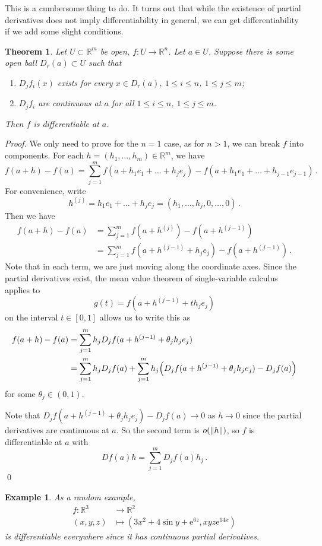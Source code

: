 \documentclass{article}
\theoremstyle{plain}\theoremheaderfont{\normalfont\itshape}\theorembodyfont{\rmfamily}\theoremseparator{.}\newtheorem*{rem}{Remark}\newtheorem*{ex}{Example}\newtheorem*{proof}{Proof}\newtheorem*{altp}{Alternative proof}
\theoremstyle{plain}\theoremheaderfont{\normalfont\bfseries}\theorembodyfont{\rmfamily}\theoremseparator{.}\newtheorem{thm}{Theorem}[section]\newtheorem{lem}[thm]{Lemma}\newtheorem{prop}[thm]{Proposition}\newtheorem*{cor}{Corollary}\newtheorem{defn}[thm]{Definition}\newtheorem{clm}[thm]{Claim}\newtheorem{clminproof}{Claim}
\theoremstyle{break}\theoremheaderfont{\normalfont\itshape}\theorembodyfont{\rmfamily}\theoremseparator{.\medskip}\newtheorem*{proofskip}{Proof}\newtheorem*{exs}{Examples}\newtheorem*{rems}{Remarks}
\theoremstyle{break}\theoremheaderfont{\normalfont\bfseries}\theorembodyfont{\rmfamily}\theoremseparator{.\medskip}\newtheorem{lemskip}[thm]{Lemma}\newtheorem{defnskip}[thm]{Definition}\newtheorem{propskip}[thm]{Proposition}\newtheorem{thmskip}[thm]{Theorem}
\newcommand{\qed}{\hfill\ensuremath{\Box}}
\newcommand{\ee}{\mathrm{e}}
\begin{document}
    This is a cumbersome thing to do. It turns out that while the existence of partial derivatives does not imply differentiability in general, we can get differentiability if we add some slight conditions.
    \begin{thm}
        Let \(U\subset\mathbb{R}^m\) be open, \(f:U\to\mathbb{R}^n\). Let \(a\in U\). Suppose there is some open ball \(D_r(a)\subset U\) such that
        \begin{enumerate}[label=(\roman*),topsep=0pt]
            \item \(D_jf_i(x)\) exists for every \(x\in D_r(a)\), \(1\le i\le n\), \(1\le j\le m\);
            \item \(D_jf_i\) are continuous at \(a\) for all \(1\le i\le n\), \(1\le j\le m\).
        \end{enumerate}
        Then \(f\) is differentiable at \(a\).
    \end{thm}
    \begin{proof}
        We only need to prove for the \(n=1\) case, as for \(n>1\), we can break \(f\) into components. For each \(h=(h_1,\dots,h_m)\in\mathbb{R}^m\), we have
        \[f(a+h)-f(a)=\sum_{j=1}^{m}f(a+h_1e_1+\dots+h_je_j)-f(a+h_1e_1+\dots+h_{j-1}e_{j-1})\,.\]
        For convenience, write
        \[h^{(j)}=h_1e_1+\dots+h_je_j=(h_1,\dots,h_j,0,\dots,0)\,.\]
        Then we have
        \begin{align*}
            f(a+h)-f(a)&=\sum_{j=1}^{m}f(a+h^{(j)})-f(a+h^{(j-1)})\\
            &=\sum_{j=1}^{m}f(a+h^{(j-1)}+h_je_j)-f(a+h^{(j-1)})\,.
        \end{align*}
        Note that in each term, we are just moving along the coordinate axes. Since the partial derivatives exist, the mean value theorem of single-variable calculus applies to
        \[g(t)=f(a+h^{(j-1)}+th_je_j)\]
        on the interval \(t\in[0,1]\) allows us to write this as
        \begin{align*}
            f(a+h)-f(a)&=\sum_{j=1}^{m}h_jD_jf(a+h^{(j-1)}+\theta_jh_je_j)\\
            &=\sum_{j=1}^{m}h_jD_jf(a)+\sum_{j=1}^{m}h_j\qty(D_jf(a+h^{(j-1)}+\theta_jh_je_j)-D_jf(a))
        \end{align*}
        for some \(\theta_j\in(0,1)\).

        Note that \(D_jf(a+h^{(j-1)}+\theta_jh_je_j)-D_jf(a)\to 0\) as \(h\to 0\) since the partial derivatives are continuous at \(a\). So the second term is \(o(\norm{h})\), so \(f\) is differentiable at \(a\) with
        \[Df(a)h=\sum_{j=1}^{m}D_jf(a)h_j\,.\]\qed
    \end{proof}
    \begin{ex}
        As a random example,
        \begin{align*}
            f:\mathbb{R}^3&\to\mathbb{R}^2\\
            (x,y,z)&\mapsto(3x^2+4\sin y+\ee^{6z},xyz \ee^{14x})
        \end{align*}
        is differentiable everywhere since it has continuous partial derivatives.
    \end{ex}
\end{document}
